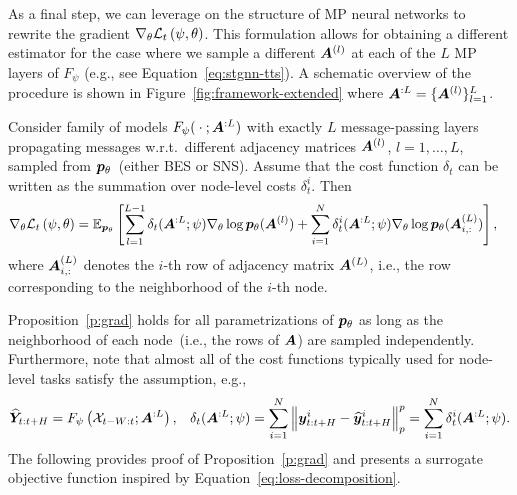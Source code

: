 As a final step, we can leverage on the structure of MP neural networks to rewrite the gradient $\nabla_\theta\mathcal{L}_t\left(\psi,\theta\right)$. This formulation allows for obtaining a different estimator for the case where we sample a different ${\bm{A}}^{(l)}$ at each of the $L$ MP layers of $F_\psi$ (e.g., see Equation~\eqref{eq:stgnn-tts}). 
A schematic overview of the procedure is shown in Figure~\ref{fig:framework-extended} where ${\bm{A}}^{:L}=\{{\bm{A}}^{(l)}\}_{l=1}^L$.
\begin{proposition}\label{p:grad}
Consider family of models $F_\psi({}\cdot{}; {\bm{A}}^{:L})$ with exactly $L$ message-passing layers propagating messages w.r.t.\ different adjacency matrices ${\bm{A}}^{(l)}$, $l=1,\dots,L$, sampled from ${{\bm{p}}_\theta}$~(either BES or SNS).
Assume that the cost function $\delta_t$ can be written as the summation over node-level costs $\delta^i_t$.
Then
\begin{align}\label{eq:loss-decomposition}
    \nabla_\theta \mathcal{L}_t\left(\psi,\theta\right)
    &= \mathbb{E}_{{{\bm{p}}_\theta}} \left[\sum_{l=1}^{L-1}\delta_t({\bm{A}}^{:L}; \psi)\nabla_\theta \log{{\bm{p}}_\theta}({\bm{A}}^{(l)}) + \sum_{i=1}^N\delta^i_t({\bm{A}}^{:L}; \psi) \nabla_\theta \log{{\bm{p}}_\theta}({\bm{A}}^{(L)}_{i,:}) \right],
\end{align}
where ${\bm{A}}^{(L)}_{i,:}$ denotes the $i$-th row of adjacency matrix ${\bm{A}}^{(L)}$, i.e., the row corresponding to the neighborhood of the $i$-th node.
\end{proposition}
Proposition~\ref{p:grad} holds for all parametrizations of ${{\bm{p}}_\theta}$ as long as the neighborhood of each node~(i.e., the rows of ${\bm{A}}$) are sampled independently. 
Furthermore, note that almost all of the cost functions typically used for node-level tasks satisfy the assumption, e.g.,
\begin{align*}
    \widehat{{\bm{Y}}}_{t:t+H} = F_\psi\left({\mathcal{X}}_{t-W:t}; {\bm{A}}^{:L}\right),&& \delta_t({\bm{A}}^{:L};\psi) = \sum_{i=1}^N \Big\lVert {\bm{y}}^i_{t:t+H} - \widehat {{\bm{y}}}^i_{t:t+H}\Big\rVert_p^p =  \sum_{i=1}^N\delta_t^i({\bm{A}}^{:L};\psi).
\end{align*}
The following provides proof of Proposition~\ref{p:grad} and presents a surrogate objective function inspired by Equation~\eqref{eq:loss-decomposition}.

